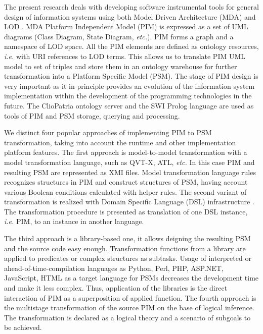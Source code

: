 \documentclass[runningheads]{llncs}
\begin{document}
The present research deals with developing software instrumental tools for general design of information systems using both Model Driven Architecture (MDA) and LOD \cite{MDA}.  MDA Platform Independent Model (PIM) is expressed as a set of UML diagrams (Class Diagram, State Diagram, \emph{etc.}).  PIM forms a graph and a namespace of LOD space.  All the PIM elements are defined as ontology resources, \emph{i.e.} with URI references to LOD terms.  This allows us to translate PIM UML model to set of triples and store them in an ontology warehouse for further transformation into a Platform Specific Model (PSM). The stage of PIM design is very important as it in principle provides an evolution of the information system implementation within the development of the programming technologies in the future. %
The ClioPatria ontology server and the SWI Prolog language \cite{Clio} are used as tools of PIM and PSM storage, querying and processing.

We distinct four popular approaches of implementing PIM to PSM transformation, taking into account the runtime and other implementation platform features.  The first approach is model-to-model transformation with a model transformation language, such as QVT-X, ATL, \emph{etc.}  In this case PIM and resulting PSM are represented as XMI files.  Model transformation language rules recognizes structures in PIM and construct structures of PSM, having account various Boolean conditions calculated with helper rules. The second variant of transformation is realized with Domain Specific Language (DSL) infrastructure \cite{stratego}.  The transformation procedure is presented as translation of one DSL instance, \emph{i.e.} PIM, to an instance in another language.

The third approach is a library-based one, it allows deigning the resulting PSM and the source code easy enough.  Transformation functions from a library are applied to predicates or complex structures as subtasks. Usage of interpreted or ahead-of-time-compilation languages as Python, Perl, PHP, ASP.NET, JavaScript, HTML as a target language for PSMs decreases the development time and make it less complex.  Thus, application of the libraries is the direct interaction of PIM as a superposition of applied function.  The fourth approach is the multistage transformation of the source PIM \cite{tereh1} on the base of logical inference.  The transformation is declared as a logical theory and a scenario of subgoals to be achieved.
\end{document}

